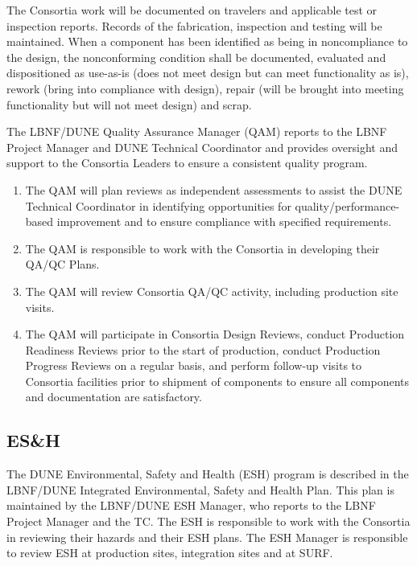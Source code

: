 The Consortia work will be documented on travelers and applicable test
or inspection reports. Records of the fabrication, inspection and
testing will be maintained. When a component has been identified as
being in noncompliance to the design, the nonconforming condition
shall be documented, evaluated and dispositioned as use-as-is (does
not meet design but can meet functionality as is), rework (bring into
compliance with design), repair (will be brought into meeting
functionality but will not meet design) and scrap.

The LBNF/DUNE Quality Assurance Manager (QAM) reports to the LBNF Project
Manager and DUNE Technical Coordinator and provides oversight and
support to the Consortia Leaders to ensure a consistent quality
program.
\begin{enumerate}
  \item The QAM will plan reviews as
independent assessments to assist the DUNE Technical Coordinator in
identifying opportunities for quality/performance-based improvement
and to ensure compliance with specified requirements.
  \item The QAM
is responsible to work with the Consortia in
developing their QA/QC Plans.
  \item The QAM will review
    Consortia QA/QC activity, including production site visits.

  \item The QAM will participate in Consortia
Design Reviews, conduct Production Readiness Reviews prior to the
start of production, conduct Production Progress Reviews on a regular
basis, and perform follow-up visits to Consortia facilities prior to
shipment of components to ensure all components and documentation are
satisfactory.
\end{enumerate}

\subsection{ES\&H}
\label{sec:fdsp-coord-esh}

The DUNE Environmental, Safety and Health (ESH) program is described
in the LBNF/DUNE Integrated Environmental, Safety and Health
Plan. This plan is maintained by the LBNF/DUNE ESH Manager, who
reports to the LBNF Project Manager and the TC. The ESH is responsible to work with the Consortia
in reviewing their hazards and their ESH plans.  The ESH Manager is
responsible to review ESH at production sites, integration sites and
at SURF.
